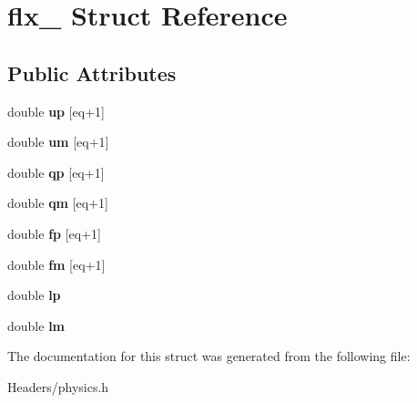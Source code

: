 \hypertarget{structflx__}{}\section{flx\+\_\+ Struct Reference}
\label{structflx__}
\subsection*{Public Attributes}
\begin{DoxyCompactItemize}
\item 
\mbox{\label{structflx___abf9b3ab55f8c467d65fa487077fae4e0}} 
double {\bfseries up} \mbox{[}eq+1\mbox{]}
\item 
\mbox{\label{structflx___ab35655ff67229c5774aa3e138c22ba06}} 
double {\bfseries um} \mbox{[}eq+1\mbox{]}
\item 
\mbox{\label{structflx___a041159f3e8f41344a88125e38246c530}} 
double {\bfseries qp} \mbox{[}eq+1\mbox{]}
\item 
\mbox{\label{structflx___a2a53deff68e3d05b14cd78591516eaef}} 
double {\bfseries qm} \mbox{[}eq+1\mbox{]}
\item 
\mbox{\label{structflx___a8cf0bb6721344f01fa41b3c5fd8dc46e}} 
double {\bfseries fp} \mbox{[}eq+1\mbox{]}
\item 
\mbox{\label{structflx___a51fe43f9045bd49602005f3b0880bc1e}} 
double {\bfseries fm} \mbox{[}eq+1\mbox{]}
\item 
\mbox{\label{structflx___a3c059cf29f3ae39908afd6cabc513c8e}} 
double {\bfseries lp}
\item 
\mbox{\label{structflx___a4f5e9eb1b246e1b7ccd1dab10c7f4bdf}} 
double {\bfseries lm}
\end{DoxyCompactItemize}


The documentation for this struct was generated from the following file\+:\begin{DoxyCompactItemize}
\item 
Headers/physics.\+h\end{DoxyCompactItemize}
